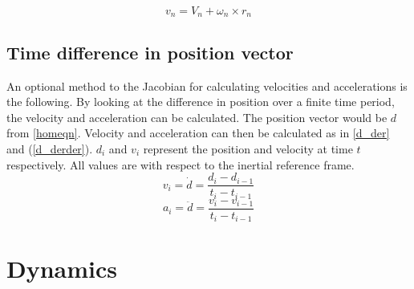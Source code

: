 \vspace{-0.5cm}
\begin{equation}\label{absvel}
v_{n}=V_n+\omega_n\times r_n
\end{equation}
\vspace{-0.5cm}

%
%

\subsection{Time difference in position vector}

An optional method to the Jacobian for calculating velocities and accelerations is the following. By looking at the difference in position over a finite time period, the velocity and acceleration can be calculated. The position vector would be $d$ from \eqref{homeqn}. Velocity and acceleration can then be calculated as in \eqref{d_der} and (\ref{d_derder}). $d_i$ and $v_i$ represent the position and velocity at time $t$ respectively. All values are with respect to the inertial reference frame.
\vspace{0.3cm}
\begin{equation}\label{d_der}
v_i = \dot{d} = \frac{d_{i}-d_{i-1}}{t_i-t_{i-1}}
\end{equation}
\vspace{-0.2cm}
\begin{equation}\label{d_derder}
a_i = \ddot{d} = \frac{v_{i}-v_{i-1}}{t_i-t_{i-1}}
\end{equation}
\vspace{-1cm}
\section{Dynamics}


